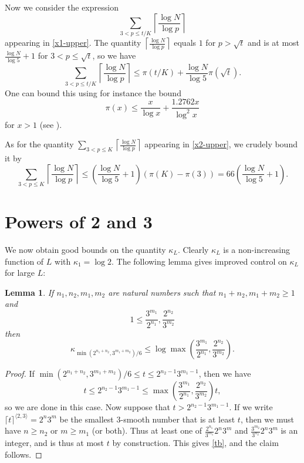 \documentclass[12pt,a4paper,reqno]{amsart}
\numberwithin{equation}{section}
\theoremstyle{plain}
\newtheorem{lemma}[theorem]{Lemma}
\theoremstyle{definition}
\begin{document}
Now we consider the expression
$$ \sum_{3 < p \leq t/K} \left\lceil \frac{\log N}{\log p} \right\rceil$$
appearing in \eqref{x1-upper}.  The quantity $\left\lceil \frac{\log N}{\log p} \right\rceil$ equals $1$ for $p > \sqrt{t}$ and is at most $\frac{\log N}{\log 5} + 1$ for $3 < p \leq \sqrt{t}$, so we have
$$ \sum_{3 < p \leq t/K} \left\lceil \frac{\log N}{\log p} \right\rceil \leq \pi(t/K) + \frac{\log N}{\log 5} \pi(\sqrt{t}).$$
One can bound this using for instance the bound
$$ \pi(x) \leq \frac{x}{\log x} + \frac{1.2762 x}{\log^2 x}$$
for $x > 1$ (see \cite[\S 3]{dusart}).

As for the quantity $\sum_{3 < p \leq K} \left\lceil \frac{\log N}{\log p} \right\rceil$ appearing in \eqref{x2-upper}, we crudely bound it by
$$\sum_{3 < p \leq K} \left\lceil \frac{\log N}{\log p} \right\rceil \leq (\frac{\log N}{\log 5}+1) (\pi(K)-\pi(3)) = 66 (\frac{\log N}{\log 5}+1).$$



\appendix

\section{Powers of 2 and 3}\label{power-sec}

We now obtain good bounds on the quantity $\kappa_L$.  Clearly $\kappa_L$ is a non-increasing function of $L$ with $\kappa_1 = \log 2$.  The following lemma gives improved control on $\kappa_L$ for large $L$:

\begin{lemma}\label{lemcount-0}  If $n_1,n_2,m_1,m_2$ are natural numbers such that $n_1+n_2, m_1+m_2 \geq 1$ and
$$ 1 \leq \frac{3^{m_1}}{2^{n_1}}, \frac{2^{n_2}}{3^{m_2}}$$
then
$$ \kappa_{\min( 2^{n_1+n_2},3^{m_1+m_2})/6} \leq \log \max\left(\frac{3^{m_1}}{2^{n_1}}, \frac{2^{n_2}}{3^{m_2}}\right).$$
\end{lemma}

\begin{proof}  If $\min( 2^{n_1+n_2},3^{m_1+m_2})/6 \leq t \leq 2^{n_2-1} 3^{m_1-1}$, then we have
\begin{equation}\label{tb} 
  t \leq 2^{n_2-1} 3^{m_1-1} \leq \max\left(\frac{3^{m_1}}{2^{n_1}}, \frac{2^{n_2}}{3^{m_2}}\right) t,
\end{equation}
so we are done in this case.  Now suppose that $t > 2^{n_2-1} 3^{m_1-1}$.
If we write $\lceil t \rceil^{\langle 2,3 \rangle} =2^n 3^m$ be the smallest $3$-smooth number that is at least $t$, then we must have $n \geq n_2$ or $m \geq m_1$ (or both).  Thus at least one of $\frac{2^{n_1}}{3^{m_1}} 2^n 3^m$ and $\frac{3^{m_2}}{3^{n_2}} 2^n 3^m$ is an integer, and is thus at most $t$ by construction.  This gives \eqref{tb}, and the claim follows.
\end{proof}
\end{document}
